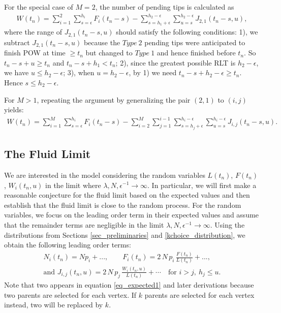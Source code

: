\documentclass[12pt]{article}
\numberwithin{equation}{section}  %
\begin{document}
For the special case of $M=2$, the number of pending tips is calculated as
\begin{align*}
W(t_n) = \sum_{i=1}^2\sum_{s=\epsilon}^{h_i}F_i(t_n-s)-\sum_{s=h_1+\epsilon}^{h_2-\epsilon}\sum_{u=s}^{h_2-\epsilon}  J_{2,1}(t_n-s,u),
\end{align*} 
where the range of $J_{2,1}(t_n-s,u)$ should satisfy the following conditions: 1), we subtract $J_{2,1}(t_n-s,u)$ because the {$Type\ 2$} pending tips were anticipated to finish POW at time $\geq t_n$ but changed to {$Type\ 1$} and hence finished before $t_n$. So $t_n-s+u\geq t_n$ and $t_n-s+h_1<t_n$; 2), since the greatest possible RLT is $h_2-\epsilon$, we have $u\leq h_2-\epsilon$; 3), when $u=h_2-\epsilon$, by 1) we need $t_n-s+h_2-\epsilon\geq t_n$. Hence $s\leq h_2-\epsilon$.

For $M>1$, repeating the argument by generalizing the pair $(2,1)$ to $(i,j)$ yields:
\begin{align}
W(t_n) = \sum_{i=1}^M\sum_{s=\epsilon}^{h_i}F_i(t_n-s)-\sum_{i=2}^M\sum_{j=1}^{i-1}\sum_{s=h_j+\epsilon}^{h_i-\epsilon}\sum_{u=s}^{h_i-\epsilon} J_{i,j}(t_n-s,u) .\label{kchoice_evo_W}
\end{align}



\subsection{The Fluid Limit}\label{k_section_fl}
We are interested in the model considering the random variables $L(t_n)$, $F(t_n)$, $W_i(t_n,u)$ in the limit where $\lambda, N, \epsilon^{-1} \rightarrow \infty$. In particular, we will first make a reasonable conjecture for the fluid limit based on the expected values and then establish that the fluid limit is close to the random process. For the random variables, we focus on the leading order term in their expected values and assume that the remainder terms are negligible in the limit $\lambda, N, \epsilon^{-1} \rightarrow \infty$. 
Using the distributions from Sections \ref{sec_preliminaries} and \ref{kchoice_distribution}, we obtain the following leading order terms:
\begin{align}
N_i(t_n) = N  p_i + ...,\quad\quad F_i(t_n) = 2 \, N \, p_i \, \frac{F(t_n)}{L(t_n)} + ...,\nonumber \\
\text{and }J_{i,j}(t_n, u) = 2 \, N \, p_j \, \frac{W_{i}(t_n, u)}{L(t_n)} + \cdots \quad \text{for } i>j,\ h_j\leq u.\label{eq_expected1}
\end{align}
Note that two appears in equation \eqref{eq_expected1} and later derivations because two parents are selected for each vertex. If $k$ parents are selected for each vertex instead, two will be replaced by $k$.
\end{document}
